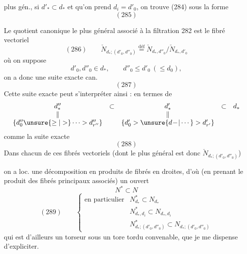 plus gén., si $d'_*\subset d_*$ et qu'on prend $d_i=d'_0$, on trouve (284) sous la forme
\[
(285)
\]

Le quotient canonique le plus général associé à la filtration 282 est le fibré vectoriel
\[
(286)\qquad\check N_{d_*;(d'_0,d''_0)}\overset{\mathrm{déf}}=\check N_{d_*,d''_0}/\check N_{d_*,d'_0}
\]
où on suppose
\[
d'_0,d''_0\in d_*,\qquad d''_0\leq d'_0\ (\leq d_0),
\]
on a donc une suite exacte can.
\[
(287)
\]
Cette suite exacte peut s'interpréter ainsi : en termes de
\[
\begin{array}{ccccc}
d''_*&\subset&d'_*&\subset&d_*\\
\Vert&&\Vert&&\\
\{d''_0\unsure{\geq|>}\cdots>d''_{r''}\}&&\{d'_0>\unsure{d\!-\!|\cdots}>d'_{r'}\}&&
\end{array}
\]
comme la suite exacte
\[
(288)
\]
Dans chacun de ces fibrés vectoriels  (dont le plus général est donc $\check N_{d_*;(d'_0,d''_0)}$)

on a loc. une décomposition en produits de fibrés en droites, d'où (en prenant le produit des fibrés principaux associés) un ouvert
\[
N^*\subset N
\]
\[
(289)\qquad\left\{\begin{array}{ll}
\text{en particulier}&N^*_{d_*}\subset N_{d_*}\\
&N^*_{d_*,d_i}\subset N_{d_*,d_i}\\
&N^*_{d_*;(d'_0,d''_0)}\subset N_{d_*;(d'_0,d''_0)}
\end{array}\right.
\]
qui est d'ailleurs un torseur sous un  tore tordu convenable, que je me dispense d'expliciter.

